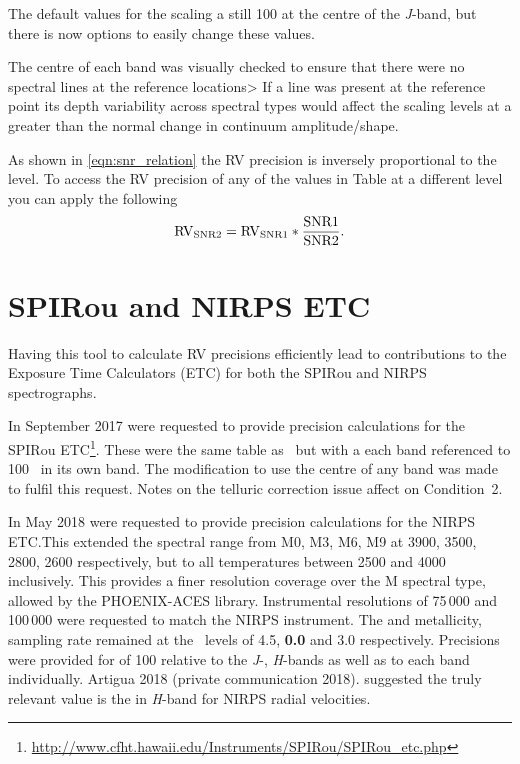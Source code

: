 {The default values for the \snr{} scaling a still 100 at the centre of the \textit{J}-band, but there is now options to easily change these values.

The centre of each band was visually checked to ensure that there were no spectral lines at the reference locations> If a line was present at the reference point its depth variability across spectral types would affect the \snr{} scaling levels at a greater than the normal change in continuum amplitude/shape.

As shown in \cref{eqn:snr_relation} the {RV} precision is inversely proportional to the \snr{} level.
To access the {RV} precision of any of the values in Table at a different \snr{} level you can apply the following
\begin{equation}
\rm {RV}_{\textrm{SNR}{}2} = {RV}_{\textrm{SNR}{}1} * \frac{\textrm{SNR}{}1}{\textrm{SNR}{}2}.
\end{equation}

\section{{SPIRou} and {NIRPS} {ETC}}\label{sec:spirou_nirps_etc}
Having this tool to calculate {RV} precisions efficiently lead to contributions to the Exposure Time Calculators (ETC) for both the {SPIRou} and {NIRPS} spectrographs.

In September 2017  were requested to provide precision calculations for the {SPIRou} ETC\footnote{\url{http://www.cfht.hawaii.edu/Instruments/SPIRou/SPIRou_etc.php}}.
These were the same table as~\citet{figueira_radial_2016} but with a each band referenced to 100~{\snr{}} in its own band.
The modification to use the centre of any band was made to fulfil this request.
Notes on the telluric correction issue affect on Condition~2.

In May 2018  were requested to provide precision calculations for the {NIRPS} {ETC}.\@ This extended the spectral range from {M0}, {M3}, {M6}, {M9} at 3900, 3500, 2800, 2600\K{} respectively, but to all temperatures between 2500 and 4000\K{} inclusively.
This provides a finer resolution coverage over the M spectral type, allowed by the {PHOENIX-ACES} library.
Instrumental resolutions of 75\,000 and 100\,000 were requested to match the {NIRPS} instrument.
The \Logg{} and metallicity, sampling rate remained at the~\citet{figueira_radial_2016} levels of 4.5, \textbf{0.0} and 3.0 respectively.\todo{}
Precisions were provided for \snr{} of 100 relative to the \emph{J}-, \emph{H}-bands as well as to each band individually.
Artigua 2018 (private communication 2018).  suggested the truly relevant value is the \snr{} in \emph{H}-band for {NIRPS} radial velocities.

}
